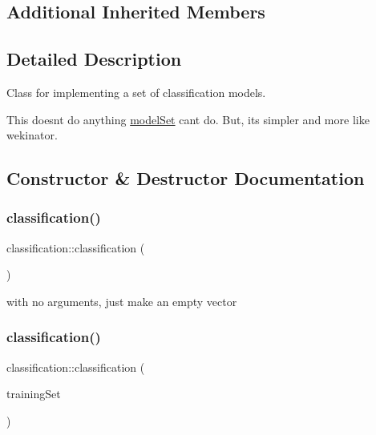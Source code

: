 \subsection*{Additional Inherited Members}


\subsection{Detailed Description}
Class for implementing a set of classification models.

This doesn\textquotesingle{}t do anything \hyperlink{classmodel_set}{model\+Set} can\textquotesingle{}t do. But, it\textquotesingle{}s simpler and more like wekinator. 

\subsection{Constructor \& Destructor Documentation}
\mbox{\label{classclassification_a96cfefed3bbc9b8b61a44b9c6cc9e29a}} 
\subsubsection{\texorpdfstring{classification()}{classification()}\hspace{0.1cm}{\footnotesize\ttfamily [1/3]}}
{\footnotesize\ttfamily classification\+::classification (\begin{DoxyParamCaption}{ }\end{DoxyParamCaption})}

with no arguments, just make an empty vector \mbox{\label{classclassification_abbc5335e5c1536a0c202a79b46dc8f23}} 
\subsubsection{\texorpdfstring{classification()}{classification()}\hspace{0.1cm}{\footnotesize\ttfamily [2/3]}}
{\footnotesize\ttfamily classification\+::classification (\begin{DoxyParamCaption}\item[{const std\+::vector$<$ \hyperlink{structtraining_example}{training\+Example} $>$ \&}]{training\+Set }\end{DoxyParamCaption})}

